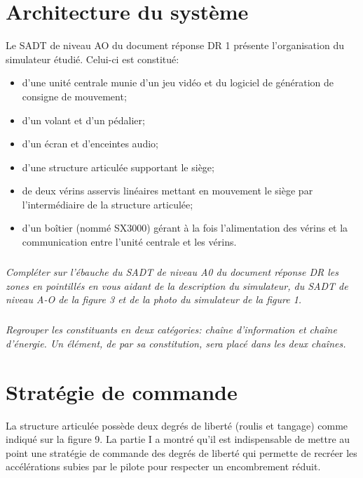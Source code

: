 \documentclass[10pt,fleqn]{article} %
\begin{document}
\section{Architecture du système \label{sec_2}}
Le SADT de niveau AO du document réponse DR 1 présente l'organisation du simulateur 
étudié. Celui-ci est constitué: 
\begin{itemize}
\item d'une unité centrale munie d'un jeu vidéo et du logiciel de génération de consigne de mouvement; 
\item d'un volant et d'un pédalier; 
\item d'un écran et d'enceintes audio; 
\item d'une structure articulée supportant le siège; 
\item de deux vérins asservis linéaires mettant en mouvement le siège par l'intermédiaire de la structure articulée; 
\item d'un boîtier (nommé SX3000) gérant à la fois l'alimentation des vérins et la communication entre l'unité centrale et les vérins. 
\end{itemize}

\subparagraph{}
\textit{Compléter sur l'ébauche du SADT de niveau A0 du document réponse DR les zones en pointillés en vous aidant de la description du simulateur, du SADT de niveau A-O de la figure 3
et de la photo du simulateur de la figure 1.}%
 
\subparagraph{}
\textit{Regrouper les constituants en deux catégories: chaîne d'information et chaîne d'énergie. Un élément, de par sa constitution, sera placé dans les deux chaînes.} 

\section{Stratégie de commande\label{sec_3}}

La structure articulée possède deux degrés de liberté (roulis et tangage) comme indiqué sur la figure 9. La partie I a montré qu'il est indispensable de mettre au point une stratégie de commande des degrés de liberté qui permette de recréer les accélérations subies par le pilote pour respecter un encombrement réduit. 
\end{document}

